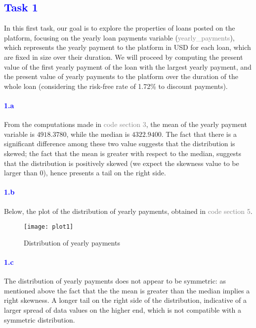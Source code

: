 \documentclass[a4paper,12pt]{article}
\begin{document}
\pagebreak
{}
\textcolor{Blue}{\section{Task 1}}
In this first task, our goal is to explore the properties of loans posted on the platform, focusing on the yearly loan payments variable (\textcolor{gray}{yearly\_payments}), which represents the yearly payment to the platform in USD for each loan, which are fixed in size over their duration. We will proceed by computing the present value of the first yearly payment of the loan with the largest yearly payment, and the present value of yearly payments to the platform over the duration of the whole loan (considering the risk-free rate of 1.72\% to discount payments).

\paragraph{\textcolor{Blue}{1.a}} From the computations made in \textcolor{gray}{code section 3}, the mean of the yearly payment variable is $4918.3780$, while the median is $4322.9400$. The fact that there is a significant difference among these two value suggests that the distribution is skewed; the fact that the mean is greater with respect to the median, suggests that the distribution is positively skewed (we expect the skewness value to be larger than 0), hence presents a tail on the right side.
\paragraph{\textcolor{Blue}{1.b}} Below, the plot of the distribution of yearly payments, obtained in \textcolor{gray}{code section 5}.
\begin{figure} [H]
    \centering
    \texttt{[image: plot1]}
    \caption{Distribution of yearly payments} 
\end{figure}
\paragraph{\textcolor{Blue}{1.c}} The distribution of yearly payments does not appear to be symmetric: as mentioned above the fact that the the mean is greater than the median implies a right skewness. A longer tail on the right side of the distribution, indicative of a larger spread of data values on the higher end, which is not compatible with a symmetric distribution.
\end{document}
